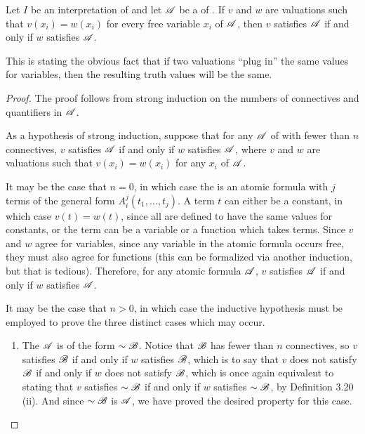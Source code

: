 \begin{proposition}
  Let \(I\) be an interpretation of \cl{} and let \(\mathscr{A}\) be a \wf{} of \cl{}. If \(v\) and \(w\) are valuations such that \(v(x_i) = w(x_i)\) for every free variable \(x_i\) of \(\mathscr{A}\), then \(v\) satisfies \(\mathscr{A}\) if and only if \(w\) satisfies \(\mathscr{A}\).

  \note{} This is stating the obvious fact that if two valuations ``plug in'' the same values for variables, then the resulting truth values will be the same.

  \begin{proof}
    The proof follows from strong induction on the numbers of connectives and quantifiers in \(\mathscr{A}\).

    As a hypothesis of strong induction, suppose that for any \wf{} \(\mathscr{A}\) of \cl{} with fewer than \(n\) connectives, \(v\) satisfies \(\mathscr{A}\) if and only if \(w\) satisfies \(\mathscr{A}\), where \(v\) and \(w\) are valuations such that \(v(x_i) = w(x_i)\) for any \(x_i\) of \(\mathscr{A}\).

    It may be the case that \(n = 0\), in which case the \wf{} is an atomic formula with \(j\) terms of the general form \(A^j_i(t_1, \dots, t_j)\). A term \(t\) can either be a constant, in which case \(v(t) = w(t)\), since all are defined to have the same values for constants, or the term can be a variable or a function which takes terms. Since \(v\) and \(w\) agree for variables, since any variable in the atomic formula occurs free, they must also agree for functions (this can be formalized via another induction, but that is tedious). Therefore, for any atomic formula \(\mathscr{A}\), \(v\) satisfies \(\mathscr{A}\) if and only if \(w\) satisfies \(\mathscr{A}\).

    It may be the case that \(n > 0\), in which case the inductive hypothesis must be employed to prove the three distinct cases which may occur.
    \begin{enumerate}
      \item The \wf{} \(\mathscr{A}\) is of the form \(\sim\mathscr{B}\). Notice that \(\mathscr{B}\) has fewer than \(n\) connectives, so \(v\) satisfies \(\mathscr{B}\) if and only if \(w\) satisfies \(\mathscr{B}\), which is to say that \(v\) does not satisfy \(\mathscr{B}\) if and only if \(w\) does not satisfy \(\mathscr{B}\), which is once again equivalent to stating that \(v\) satisfies \(\sim\mathscr{B}\) if and only if \(w\) satisfies \(\sim\mathscr{B}\), by Definition 3.20 (ii). And since \(\sim\mathscr{B}\) is \(\mathscr{A}\), we have proved the desired property for this case.


\end{enumerate}
\end{proof}
\end{proposition}
